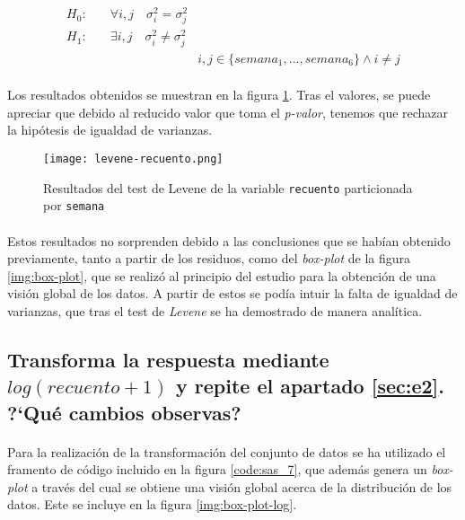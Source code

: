 \documentclass[11pt]{article}
\begin{document}
      \begin{align*}
        H_0:& \quad \forall i,j \quad \sigma^2_{i} = \sigma^2_{j} & \\
        H_1:& \quad \exists i,j \quad \sigma^2_{i} \neq \sigma^2_{j} & \\
        & & i,j \in \{semana_1,...,semana_6\} \land i \neq j
      \end{align*}

      \paragraph{}
      Los resultados obtenidos se muestran en la figura \ref{img:levene-test}. Tras el valores, se puede apreciar que debido al reducido valor que toma el \emph{p-valor}, tenemos que rechazar la hipótesis de igualdad de varianzas.

      \begin{figure}[!h]
        \centering
        \texttt{[image: levene-recuento.png]}
        \caption{Resultados del test de Levene de la variable \texttt{recuento} particionada por \texttt{semana}}
        \label{img:levene-test}
      \end{figure}

      \paragraph{}
      Estos resultados no sorprenden debido a las conclusiones que se habían obtenido previamente, tanto a partir de los residuos, como del \emph{box-plot} de la figura \ref{img:box-plot}, que se realizó al principio del estudio para la obtención de una visión global de los datos. A partir de estos se podía intuir la falta de igualdad de varianzas, que tras el test de \emph{Levene} se ha demostrado de manera analítica.


    \subsection{Transforma la respuesta mediante $log(recuento + 1)$ y repite el apartado \ref{sec:e2}. ?`Qué cambios observas?}
    \label{sec:e4}

      \paragraph{}
      Para la realización de la transformación del conjunto de datos se ha utilizado el framento de código incluido en la figura \ref{code:sas_7}, que además genera un \emph{box-plot} a través del cual se obtiene una visión global acerca de la distribución de los datos. Este se incluye en la figura \ref{img:box-plot-log}.
\end{document}
